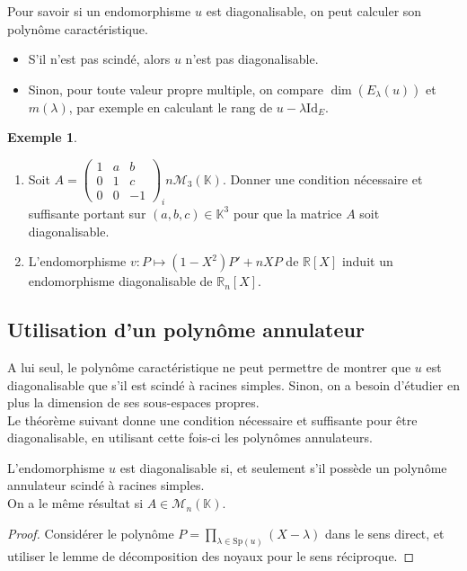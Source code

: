 \documentclass[french]{article}
\newcommand{\R}{\mathbb{R}}
\newcommand{\K}{\mathbb{K}}
\newcommand{\Sp}{\text{Sp}}
\theoremstyle{plain}
\theoremstyle{definition}
\newtheorem*{ex}{Exemple}
\theoremstyle{remark}
\begin{document}
	\begin{met}
		Pour savoir si un endomorphisme $u$ est diagonalisable, on peut calculer son polynôme caractéristique.
		\begin{itemize}
			\item S'il n'est pas scindé, alors $u$ n'est pas diagonalisable.
			\item Sinon, pour toute valeur propre multiple, on compare $\dim(E_\lambda(u))$ et $m(\lambda)$, par exemple en calculant le rang de $u-\lambda\text{Id}_E$.
		\end{itemize}
	\end{met}
	
	\begin{ex}
		\begin{enumerate}
			\item Soit $A=\begin{pmatrix}
				1&a&b\\
				0&1&c\\
				0&0&-1
			\end{pmatrix}_in\mathcal{M}_3(\K)$. Donner une condition nécessaire et suffisante portant sur $(a,b,c)\in\K^3$ pour que la matrice $A$ soit diagonalisable.
			\item L'endomorphisme $v:P\mapsto (1-X^2)P'+nXP$ de $\R[X]$ induit un endomorphisme diagonalisable de $\R_n[X]$.
		\end{enumerate}
	\end{ex}
	
	\subsection{Utilisation d'un polynôme annulateur}
	
	A lui seul, le polynôme caractéristique ne peut permettre de montrer que $u$ est diagonalisable que s'il est scindé à racines simples. Sinon, on a besoin d'étudier en plus la dimension de ses sous-espaces propres.\\
	Le théorème suivant donne une condition nécessaire et suffisante pour être diagonalisable, en utilisant cette fois-ci les polynômes annulateurs.
	
	\begin{thm}%
		L'endomorphisme $u$ est diagonalisable si, et seulement s'il possède un polynôme annulateur scindé à racines simples.\\
		On a le même résultat si $A\in\mathcal{M}_n(\K)$.
	\end{thm}
	\begin{proof}
		Considérer le polynôme $P=\displaystyle\prod_{\lambda\in\Sp(u)}(X-\lambda)$ dans le sens direct, et utiliser le lemme de décomposition des noyaux pour le sens réciproque.
	\end{proof}
	
\end{document}
